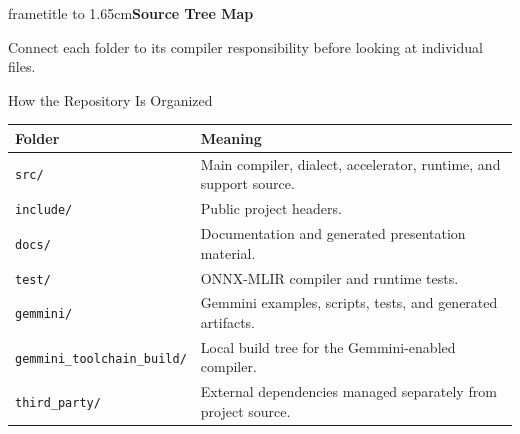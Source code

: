\documentclass[aspectratio=169,10pt]{beamer}
\newcommand{\code}[1]{\texttt{\footnotesize #1}}
\newcommand{\sectiondivider}[2]{
  \begin{frame}[plain]
    \vspace*{1.75cm}
    \begin{beamercolorbox}[wd=\paperwidth,ht=1.65cm,dp=0cm,center]{frametitle}
      \vbox to 1.65cm{\vfil{\Large\bfseries #1}\vfil}
    \end{beamercolorbox}
    \vspace{0.65cm}
    \begin{center}
      {\large #2}
    \end{center}
  \end{frame}
}
\begin{document}
\sectiondivider{Source Tree Map}{Connect each folder to its compiler responsibility before looking at individual files.}

\begin{frame}{How the Repository Is Organized}
  \scriptsize
  \begin{tabularx}{\textwidth}{@{}lX@{}}
    \toprule
    Folder & Meaning \\
    \midrule
    \code{src/} & Main compiler, dialect, accelerator, runtime, and support source. \\
    \code{include/} & Public project headers. \\
    \code{docs/} & Documentation and generated presentation material. \\
    \code{test/} & ONNX-MLIR compiler and runtime tests. \\
    \code{gemmini/} & Gemmini examples, scripts, tests, and generated artifacts. \\
    \code{gemmini\_toolchain\_build/} & Local build tree for the Gemmini-enabled compiler. \\
    \code{third\_party/} & External dependencies managed separately from project source. \\
    \bottomrule
  \end{tabularx}
\end{frame}
\end{document}
